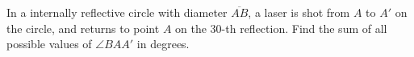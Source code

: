 In a internally reflective circle with diameter $\overline{AB}$, a laser is shot from $A$ to $A'$ on the circle, and returns to point $A$ on the $30$-th reflection. Find the sum of all possible values of $\angle BAA'$ in degrees.
